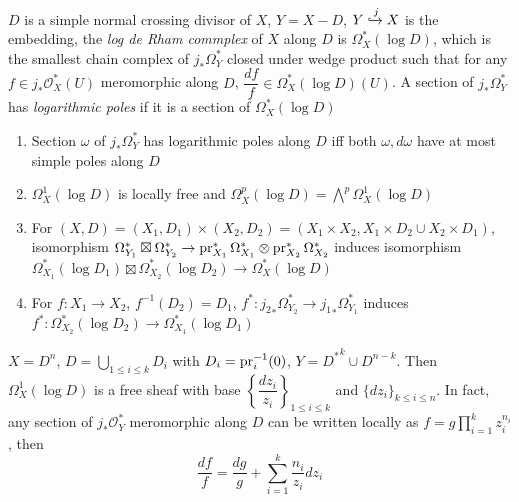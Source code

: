 \documentclass[main]{subfiles}
\begin{document}
\begin{definition}
$D$ is a simple normal crossing divisor of $X$, $Y=X-D$, $Y\xhookrightarrow j X$ is the embedding, the \textit{log de Rham commplex} of $X$ along $D$ is $\Omega_X^*(\log D)$, which is the smallest chain complex of $j_*\Omega^*_Y$ closed under wedge product such that for any $f\in j_*\mathcal O^*_X(U)$ meromorphic along $D$, $\dfrac{df}{f}\in\Omega^*_X(\log D)(U)$. A section of $j_*\Omega^*_Y$ has \textit{logarithmic poles} if it is a section of $\Omega^*_X(\log D)$
\end{definition}

\begin{proposition}\hfill
\begin{enumerate}[leftmargin=*,label=\textbf{\arabic*.}]
\item Section $\omega$ of $j_*\Omega^*_Y$ has logarithmic poles along $D$ iff both $\omega,d\omega$ have at most simple poles along $D$
\item $\Omega^1_X(\log D)$ is locally free and $\Omega^p_X(\log D)=\bigwedge^p\Omega^1_X(\log D)$
\item For $(X,D)=(X_1,D_1)\times(X_2,D_2)=(X_1\times X_2,X_1\times D_2\cup X_2\times D_1)$, isomorphism $\Omega^*_{Y_1}\boxtimes\Omega^*_{Y_2}\to\operatorname{pr}^*_{X_1}\Omega^*_{X_1}\otimes\operatorname{pr}^*_{X_2}\Omega^*_{X_2}$ induces isomorphism $\Omega^*_{X_1}(\log D_1)\boxtimes\Omega^*_{X_2}(\log D_2)\to\Omega^*_{X}(\log D)$
\item For $f:X_1\to X_2$, $f^{-1}(D_2)=D_1$, $f^*:{j_2}_*\Omega^*_{Y_2}\to{j_1}_*\Omega^*_{Y_1}$ induces $f^*:\Omega^*_{X_2}(\log D_2)\to\Omega^*_{X_1}(\log D_1)$
\end{enumerate}
\end{proposition}

\begin{lemma}
$X=D^n$, $D=\displaystyle\bigcup_{1\leq i\leq k} D_i$ with $D_i=\operatorname{pr}_i^{-1}(0)$, $Y={D^*}^k\cup D^{n-k}$. Then $\Omega^1_X(\log D)$ is a free sheaf with base $\left\{\dfrac{dz_i}{z_i}\right\}_{1\leq i\leq k}$ and $\{dz_i\}_{k\leq i\leq n}$. In fact, any section of $j_*\mathcal O^*_Y$ meromorphic along $D$ can be written locally as $\displaystyle f=g\prod_{i=1}^kz_i^{n_i}$, then 
\[\dfrac{df}{f}=\dfrac{dg}{g}+\sum_{i=1}^k\frac{n_i}{z_i}dz_i\]
\end{lemma}
\end{document}
